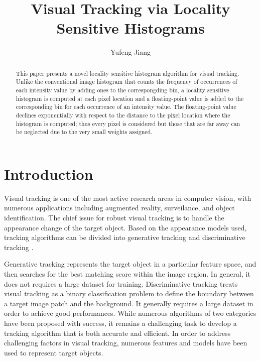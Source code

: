 \documentclass[10pt,twocolumn,letterpaper]{article}
\begin{document}
\title{Visual Tracking via Locality Sensitive Histograms}
\author{Yufeng Jiang}
\maketitle
\balance

\begin{abstract}

This paper presents a novel locality sensitive histogram algorithm for visual tracking. Unlike the conventional image histogram that counts the frequency of occurrences of each intensity value by adding ones to the correspongding bin, a locality sensitive histogram is computed at each pixel location and a floating-point value is added to the corresponding bin for each occurrence of an intensity value. The floating-point value declines exponentially with respect to the distance to the pixel location where the histogram is computed; thus every pixel is considered but those that are far away can be neglected due to the very small weights assigned. 

\end{abstract}

\section{Introduction}

Visual tracking is one of the most active research areas in computer vision, with numerous applications including augmented reality, surveilance, and object identification. The chief issue for robust visual tracking is to handle the appearance change of the target object. Based on the appearance models used, tracking algorithms can be divided into generative tracking \cite{Eigentracking,object,Visual,Real} and discriminative tracking \cite{Semi,Robusts,Tracking,Struck}.

Generative tracking represents the target object in a particular feature space, and then searches for the best matching score within the image region. In general, it does not requires a large dataset for training. Discriminative tracking treats visual tracking as a binary classification problem to define the boundary between a target image patch and the background. It generally requires a large dataset in order to achieve good performances. While numerous algorithms of two categories have been proposed with success, it remains a challenging task to develop a tracking algorithm that is both accurate and efficient. In order to address challenging factors in visual tracking, numerous features and models have been used to represent target objects.
\end{document}
